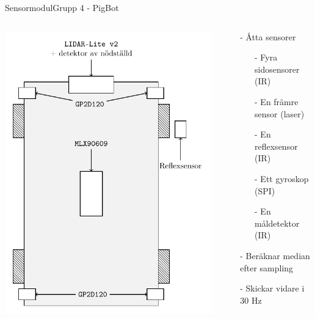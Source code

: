 \begin{frame}{Sensormodul}{Grupp 4 - PigBot} 
  \begin{columns}
    \begin{column}{0.5\textwidth}
      \centering
      \includegraphics[scale=0.6]{images/sensor.pdf}
    \end{column}
    \begin{column}{0.5\textwidth}
      \begin{itemize}
	\item[-] Åtta sensorer
	  \begin{itemize}
	    \item[-] Fyra sidosensorer (IR)
	    \item[-] En främre sensor (laser)
	    \item[-] En reflexsensor (IR)
	    \item[-] Ett gyroskop (SPI)
	    \item[-] En måldetektor (IR)
	  \end{itemize}
	  \pause
	\item[-] Beräknar median efter sampling
	  \pause
	\item[-] Skickar vidare i $30$ Hz
      \end{itemize}
    \end{column}

  \end{columns}
\end{frame}

